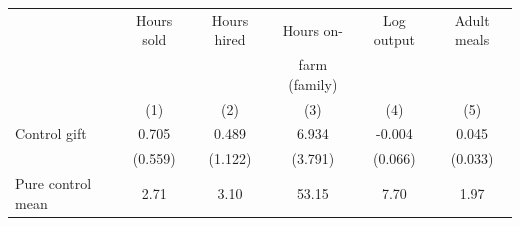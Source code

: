 \begin{tabular}{l cc cc c}
\hline
 & Hours sold & Hours hired & Hours on- & Log output & Adult meals \\ 
 & & & farm (family) & &  \\ 
 & (1) & (2) & (3) & (4) & (5)   \\ 
\hline
Control gift & 0.705 & 0.489 & 6.934 & -0.004 & 0.045 \\
 & (0.559) & (1.122) & (3.791) & (0.066) & (0.033) \\
\hline 
Pure control mean & 2.71 & 3.10 & 53.15 & 7.70 & 1.97 \\
 \hline 
\end{tabular} \\
